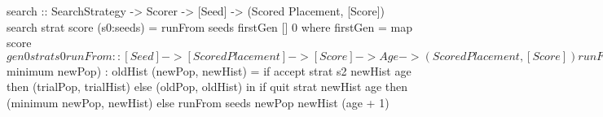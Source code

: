 search :: SearchStrategy -> Scorer -> [Seed]
       -> (Scored Placement, [Score])
search strat score (s0:seeds) = runFrom seeds firstGen [] 0
 where
  firstGen = map score $ gen0 strat s0
  runFrom :: [Seed] -> [Scored Placement] -> [Score]
          -> Age -> (Scored Placement, [Score])
  runFrom (s1:s2:seeds) oldPop oldHist age =
    let trialPop  = nextGen strat s1 score oldPop
        trialHist = (scoreOf $ minimum newPop) : oldHist
        (newPop, newHist) =
          if accept strat s2 newHist age then
            (trialPop, trialHist)
          else
            (oldPop, oldHist)
    in  if quit strat newHist age then
          (minimum newPop, newHist)
        else
          runFrom seeds newPop newHist (age + 1)
